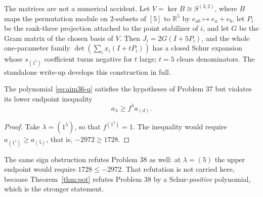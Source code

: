 \begin{remark}
The matrices are not a numerical accident.  Let $V=\ker B\cong S^{(3,2)}$, where $B$ maps the permutation module on $2$-subsets of $[5]$ to $\mathbb R^5$ by $e_{ab}\mapsto e_a+e_b$, let $P_i$ be the rank-three projection attached to the point stabilizer of $i$, and let $G$ be the Gram matrix of the chosen basis of $V$.  Then $J_i=2G(I+5P_i)$, and the whole one-parameter family $\det(\sum_ix_i(I+tP_i))$ has a closed Schur expansion whose $s_{(1^5)}$ coefficient turns negative for $t$ large; $t=5$ clears denominators.  The standalone write-up  develops this construction in full.
\end{remark}

\begin{theorem}\label{thm:aim37}
The polynomial \eqref{eq:aim36-q} satisfies the hypotheses of Problem 37 but violates its lower endpoint inequality
\[
a_\lambda\ge f^\lambda a_{(d)}.
\]
\end{theorem}
\begin{proof}
Take $\lambda=(1^5)$, so that $f^{(1^5)}=1$.  The inequality would require $a_{(1^5)}\ge a_{(5)}$, that is, $-2972\ge1728$.
\end{proof}

\begin{remark}
The same sign obstruction refutes Problem 38 as well: at $\lambda=(5)$ the upper endpoint would require $1728\le-2972$.  That refutation is not carried here, because Theorem~\ref{thm:pot} refutes Problem 38 by a Schur-\emph{positive} polynomial, which is the stronger statement.
\end{remark}
